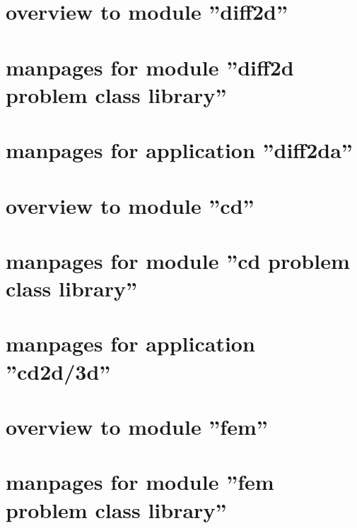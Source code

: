 \newpage
{
\small
\tableofcontents
}
\clearpage

\thispagestyle{plain}
\section{overview to module ''diff2d''}
\renewcommand{\sectitle}{diff2d}


\thispagestyle{plain}
\section{manpages for module ''diff2d problem class library''}
\renewcommand{\sectitle}{diff2d pclib}


\thispagestyle{plain}
\section{manpages for application ''diff2da''}
\renewcommand{\sectitle}{application diff2da}


\thispagestyle{plain}
\section{overview to module ''cd''}
\renewcommand{\sectitle}{cd}


\thispagestyle{plain}
\section{manpages for module ''cd problem class library''}
\renewcommand{\sectitle}{cd pclib}


\thispagestyle{plain}
\section{manpages for application ''cd2d/3d''}
\renewcommand{\sectitle}{application cd2d/3d}



\thispagestyle{plain}
\section{overview to module ''fem''}
\renewcommand{\sectitle}{fem}


\thispagestyle{plain}
\section{manpages for module ''fem problem class library''}
\renewcommand{\sectitle}{fem pclib}


